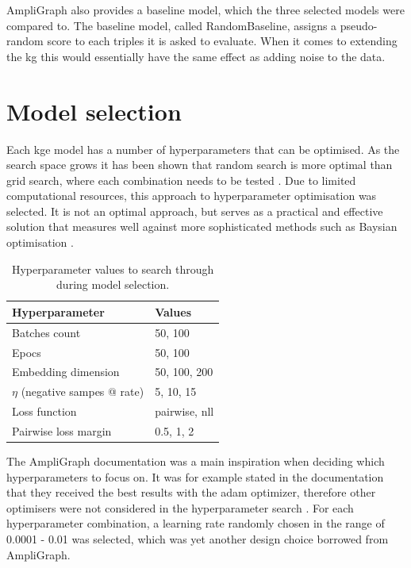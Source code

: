 AmpliGraph also provides a baseline model, which the three selected models were compared to. The baseline model, called RandomBaseline, assigns a pseudo-random score to each triples it is asked to evaluate. When it comes to extending the \gls{kg} this would essentially have the same effect as adding noise to the data.

\section{Model selection}
Each \gls{kge} model has a number of hyperparameters that can be optimised. As the search space grows it has been shown that random search is more optimal than grid search, where each combination needs to be tested \cite{bergstra2012random}. Due to limited computational resources, this approach to hyperparameter optimisation was selected. It is not an optimal approach, but serves as a practical and effective solution that measures well against more sophisticated methods such as Baysian optimisation \cite{li2017hyperband}.

\begin{table}[htbp]
\centering
\begin{tabular}{|l|l|}
\hline
\textbf{Hyperparameter}      & \textbf{Values}             \\ \hline
Batches count       & 50, 100                              \\ \hline
Epocs               & 50, 100                          \\ \hline
Embedding dimension                   & 50, 100, 200                     \\ \hline
$\eta$ (negative sampes @ rate)     & 5, 10, 15                            \\ \hline
Loss function   & pairwise, nll                         \\ \hline
Pairwise loss margin    & 0.5, 1, 2                    \\ \hline
\end{tabular}
\caption[Hyperparameter values for model selection.]{Hyperparameter values to search through during model selection.}
\end{table}
The AmpliGraph documentation was a main inspiration when deciding which hyperparameters to focus on. It was for example stated in the documentation that they received the best results with the adam optimizer, therefore other optimisers were not considered in the hyperparameter search \cite{ampligraph_documentation}. For each hyperparameter combination, a learning rate randomly chosen in the range of 0.0001 - 0.01 was selected, which was yet another design choice borrowed from AmpliGraph.

